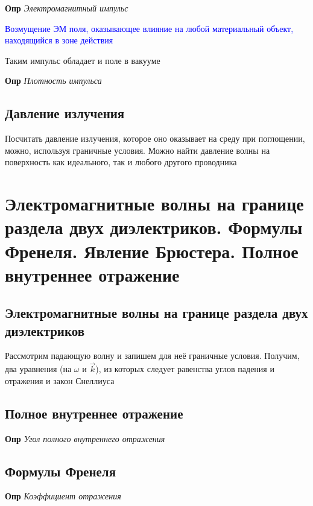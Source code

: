 \documentclass[a4paper, 14pt]{article}
\begin{document}
    \textbf{Опр} \textit{Электромагнитный импульс}
    
    \textcolor{blue}{Возмущение ЭМ поля, оказывающее влияние на любой материальный объект, находящийся в зоне действия}
    
    Таким импульс обладает и поле в вакууме
    
    \textbf{Опр} \textit{Плотность импульса}
    
    \subsection{Давление излучения}

    
    Посчитать давление излучения, которое оно оказывает на среду при поглощении, можно, используя граничные условия.
    Можно найти давление волны на поверхность как идеального, так и любого другого проводника
    
    \section{Электромагнитные волны на границе раздела двух диэлектриков.
    Формулы Френеля.
    Явление Брюстера.
    Полное внутреннее отражение}
    
    \subsection{Электромагнитные волны на границе раздела двух диэлектриков}
    
    Рассмотрим падающую волну и запишем для неё граничные условия.
    Получим, два уравнения (на $\omega$ и $\overrightarrow{k}$), из которых следует равенства углов падения и
    отражения и закон Снеллиуса
    
    \subsection{Полное внутреннее отражение}
    
    \textbf{Опр} \textit{Угол полного внутреннего отражения}
    
    \subsection{Формулы Френеля}
    
    \textbf{Опр} \textit{Коэффициент отражения}
    
\end{document}
